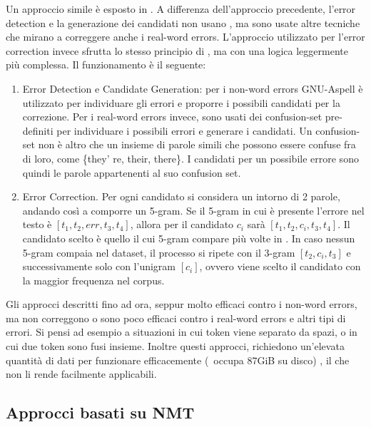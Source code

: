 Un approccio simile è esposto in \cite{ocrG2}. A differenza dell'approccio precedente, l'error detection e la generazione dei candidati non usano \gw, ma sono usate altre tecniche che mirano a correggere anche i real-word errors. L'approccio utilizzato per l'error correction invece sfrutta lo stesso principio di \cite{ocrG1}, ma con una logica leggermente più complessa. Il funzionamento è il seguente:
\begin{enumerate}
\item Error Detection e Candidate Generation: per i non-word errors GNU-Aspell\cite{atkinsongnu} è utilizzato per individuare gli errori e proporre i possibili candidati per la correzione. Per i real-word errors invece, sono usati dei confusion-set pre-definiti per individuare i possibili errori e generare i candidati. Un confusion-set non  è altro che un insieme di parole simili che possono essere confuse fra di loro, come \{they'
re, their, there\}. I candidati per un possibile errore sono quindi le parole appartenenti al suo confusion set.

\item Error Correction. Per ogni candidato si considera un intorno di 2 parole, andando così a comporre un 5-gram. Se il 5-gram in cui è presente l'errore nel testo è $[t_1,t_2,\textit{err},t_3,t_4]$, allora per il candidato $c_i$ sarà $[t_1,t_2,c_i,t_3,t_4]$. Il candidato scelto è quello il cui 5-gram compare più volte in \gw. In caso nessun 5-gram compaia nel dataset, il processo si ripete con il 3-gram $[t_2,c_i,t_3]$ e successivamente solo con l'unigram $[c_i]$, ovvero viene scelto il candidato con la maggior frequenza nel corpus.
\end{enumerate}
Gli approcci descritti fino ad ora, seppur molto efficaci contro i non-word errors, ma non correggono o sono poco efficaci contro i real-word errors e altri tipi di errori. Si pensi ad esempio a situazioni in cui token viene separato da spazi, o in cui due token sono fusi insieme. Inoltre questi approcci, richiedono un'elevata quantità di dati per funzionare efficacemente (\gw\ occupa 87GiB su disco) , il che non li rende facilmente applicabili.


\subsection{Approcci basati su NMT}
\label{sec:arte_nmt}
